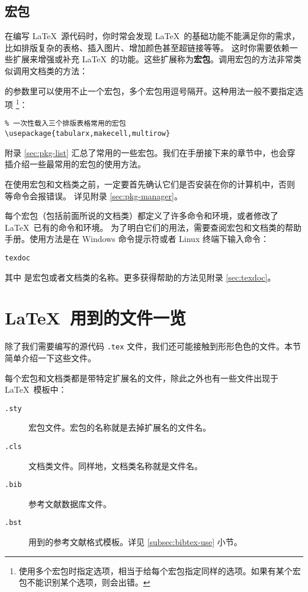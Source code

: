 \subsection{宏包}\label{subsec:packages}

在编写 \LaTeX\ 源代码时，你时常会发现 \LaTeX\ 的基础功能不能满足你的需求，比如排版复杂的表格、插入图片、增加颜色甚至超链接等等。
这时你需要依赖一些扩展来增强或补充 \LaTeX\ 的功能。这些扩展称为\textbf{宏包}。调用宏包的方法非常类似调用文档类的方法：
\begin{command}
\end{command}

的参数里可以使用不止一个宏包，多个宏包用逗号隔开。这种用法一般不要指定选项%
\footnote{使用多个宏包时指定选项，相当于给每个宏包指定同样的选项。如果有某个宏包不能识别某个选项，则会出错。}：
\begin{verbatim}
% 一次性载入三个排版表格常用的宏包
\usepackage{tabularx,makecell,multirow}
\end{verbatim}

附录 \ref{sec:pkg-list} 汇总了常用的一些宏包。我们在手册接下来的章节中，也会穿插介绍一些最常用的宏包的使用方法。

在使用宏包和文档类之前，一定要首先确认它们是否安装在你的计算机中，否则  等命令会报错误。
详见附录 \ref{sec:pkg-manager}。

每个宏包（包括前面所说的文档类）都定义了许多命令和环境，或者修改了 \LaTeX\ 已有的命令和环境。
为了明白它们的用法，需要查阅宏包和文档类的帮助手册。使用方法是在 Windows 命令提示符或者 Linux 终端下输入命令：
\begin{command}
\texttt{texdoc} 
\end{command}

其中  是宏包或者文档类的名称。更多获得帮助的方法见附录 \ref{sec:texdoc}。

\section{\LaTeX\ 用到的文件一览}\label{sec:latex-files}

除了我们需要编写的源代码 \texttt{.tex} 文件，我们还可能接触到形形色色的文件。本节简单介绍一下这些文件。

每个宏包和文档类都是带特定扩展名的文件，除此之外也有一些文件出现于 \LaTeX\ 模板中：
\begin{description}
  \item[\texttt{.sty}] 宏包文件。宏包的名称就是去掉扩展名的文件名。
  \item[\texttt{.cls}] 文档类文件。同样地，文档类名称就是文件名。
  \item[\texttt{.bib}]  参考文献数据库文件。
  \item[\texttt{.bst}]  用到的参考文献格式模板。详见 \ref{subsec:bibtex-use} 小节。
\end{description}

